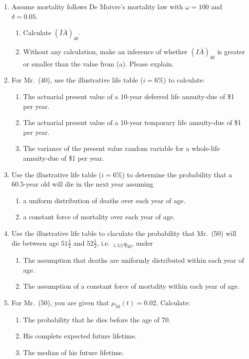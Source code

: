 \documentclass[11pt,fleqn,oneside]{book}
\begin{document}
\begin{enumerate}
\begin{enumerate}
\end{enumerate}
\item Assume mortality follows De Moivre's mortality law with $\omega=100$ and $\delta=0.05$.
\begin{enumerate}
\item Calculate $\left(\bar{I}\bar{A}\right)_{40}$.
\item Without any calculation, make an inference of whether $\left(I\bar{A}\right)_{40}$ is greater or smaller than the value from (a). Please explain.
\end{enumerate}
\item  For Mr.\ (40), use the illustrative life table ($i=6\%$) to calculate:
\begin{enumerate}
\item The actuarial present value of a 10-year deferred life annuity-due of \$1 per year.
\item The actuarial present value of a 10-year temporary life annuity-due of \$1 per year.
\item The variance of the present value random variable for a whole-life annuity-due of \$1 per year.
\end{enumerate} 
\item Use the illustrative life table ($i=6\%$) to determine the probability that a $60.5$-year old will die in the next year assuming
\begin{enumerate}
\item a uniform distribution of deaths over each year of age.
\item a constant force of mortality over each year of age.
\end{enumerate}
\item Use the illustrative life table to claculate the probability that Mr.\ (50) will die between age $51\frac{1}{2}$ and $52\frac{1}{2}$, i.e.\ $_{{1.5}|1}q_{50}$, under
\begin{enumerate}
\item The assumption that deaths are uniformly distributed within each year of age.
\item The assumption of a constant force of mortality within each year of age.
\end{enumerate}
\item For Mr.\ (50), you are given that $\mu_{50}(t) = 0.02$. Calculate:
\begin{enumerate}
\item The probability that he dies before the age of 70.
\item His complete expected future lifetime.
\item The median of his future lifetime.
\end{enumerate}
\end{enumerate}
\end{document}
